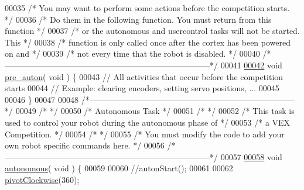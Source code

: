 \begin{DoxyCode}
00035 \textcolor{comment}{/*  You may want to perform some actions before the competition starts.      */}
00036 \textcolor{comment}{/*  Do them in the following function.  You must return from this function   */}
00037 \textcolor{comment}{/*  or the autonomous and usercontrol tasks will not be started.  This       */}
00038 \textcolor{comment}{/*  function is only called once after the cortex has been powered on and    */} 
00039 \textcolor{comment}{/*  not every time that the robot is disabled.                               */}
00040 \textcolor{comment}{/*---------------------------------------------------------------------------*/}
00041 
\mbox{\hyperlink{main_8cpp_ac6b858ea8606cdfaee934aac6be66a96_ac6b858ea8606cdfaee934aac6be66a96}{00042}} \textcolor{keywordtype}{void} \mbox{\hyperlink{main_8cpp_ac6b858ea8606cdfaee934aac6be66a96_ac6b858ea8606cdfaee934aac6be66a96}{pre\_auton}}( \textcolor{keywordtype}{void} ) \{
00043   \textcolor{comment}{// All activities that occur before the competition starts}
00044   \textcolor{comment}{// Example: clearing encoders, setting servo positions, ...}
00045   
00046 \}
00047 
00048 \textcolor{comment}{/*---------------------------------------------------------------------------*/}
00049 \textcolor{comment}{/*                                                                           */}
00050 \textcolor{comment}{/*                              Autonomous Task                              */}
00051 \textcolor{comment}{/*                                                                           */}
00052 \textcolor{comment}{/*  This task is used to control your robot during the autonomous phase of   */}
00053 \textcolor{comment}{/*  a VEX Competition.                                                       */}
00054 \textcolor{comment}{/*                                                                           */}
00055 \textcolor{comment}{/*  You must modify the code to add your own robot specific commands here.   */}
00056 \textcolor{comment}{/*---------------------------------------------------------------------------*/}
00057 
\mbox{\hyperlink{main_8cpp_a2df3d06bc5bced154da27fce393f991f_a2df3d06bc5bced154da27fce393f991f}{00058}} \textcolor{keywordtype}{void} \mbox{\hyperlink{main_8cpp_a2df3d06bc5bced154da27fce393f991f_a2df3d06bc5bced154da27fce393f991f}{autonomous}}( \textcolor{keywordtype}{void} ) \{
00059 
00060   \textcolor{comment}{//autonStart();}
00061   
00062   \mbox{\hyperlink{auton_8h_a7c81bf7b683346af95d1ff72eb60619f_a7c81bf7b683346af95d1ff72eb60619f}{pivotClockwise}}(360); 

\end{DoxyCode}
